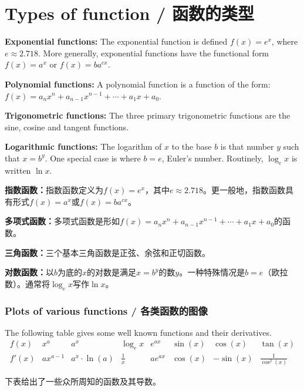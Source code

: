 \section{Types of function / 函数的类型}

\begin{original}
\textbf{Exponential functions:} The exponential function is defined $f(x) = e^x$, where $e \approx 2.718$. More generally, exponential functions have the functional form $f(x) = a^x$ or $f(x) = b a^{cx}$.

\textbf{Polynomial functions:} A polynomial function is a function of the form: $f(x) = a_n x^n + a_{n-1} x^{n-1} + \cdots + a_1 x + a_0$.

\textbf{Trigonometric functions:} The three primary trigonometric functions are the sine, cosine and tangent functions.

\textbf{Logarithmic functions:} The logarithm of $x$ to the base $b$ is that number $y$ such that $x = b^y$. One special case is where $b = e$, Euler's number. Routinely, $\log_e x$ is written $\ln x$.
\end{original}
\begin{translation}
\textbf{指数函数：}指数函数定义为$f(x) = e^x$，其中$e \approx 2.718$。更一般地，指数函数具有形式$f(x) = a^x$或$f(x) = b a^{cx}$。

\textbf{多项式函数：}多项式函数是形如$f(x) = a_n x^n + a_{n-1} x^{n-1} + \cdots + a_1 x + a_0$的函数。

\textbf{三角函数：}三个基本三角函数是正弦、余弦和正切函数。

\textbf{对数函数：}以$b$为底的$x$的对数是满足$x = b^y$的数$y$。一种特殊情况是$b = e$（欧拉数）。通常将$\log_e x$写作$\ln x$。
\end{translation}

\subsubsection{Plots of various functions / 各类函数的图像}

\begin{original}
The following table gives some well known functions and their derivatives.
\[
\begin{array}{c|ccccccc}
f(x) & x^a & a^x & \log_e x & e^{ax} & \sin(x) & \cos(x) & \tan(x) \\
\hline
f'(x) & a x^{a-1} & a^x \cdot \ln(a) & \frac{1}{x} & a e^{ax} & \cos(x) & -\sin(x) & \frac{1}{\cos^2(x)}
\end{array}
\]
\end{original}
\begin{translation}
下表给出了一些众所周知的函数及其导数。
\end{translation}

